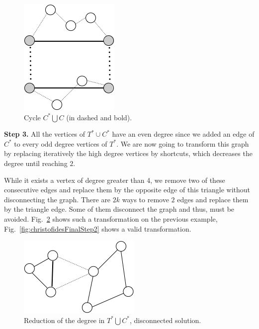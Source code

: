 \begin{figure}[hbt]
\begin{center}
       \includegraphics[scale=0.7]{FiguresGraph/perfectmatching3}
       \caption{Cycle $C^* \bigcup C$ (in dashed and bold).}
              \label{fig:perfectMatchingC}
\end{center}
\end{figure}

\bigskip

\textbf{Step 3.} 
All the vertices of $T^* \cup C^*$ have an even degree since we added an edge of $C^*$ to every odd degree vertices of $T^*$. 
We are now going to transform this graph by replacing iteratively the high degree vertices by shortcuts, 
which decreases the degree until reaching $2$. 

While it exists a vertex of degree greater than 4, we remove two of these consecutive edges and replace them 
by the opposite edge of this triangle 
without disconnecting the graph. 
There are $2k$ ways to remove $2$ edges and replace them by the triangle edge. 
Some of them disconnect the graph and thus, must be avoided. 
Fig.~\ref{fig:christofidesFinalStep1} shows such a transformation on the previous example, 
Fig.~\ref{fig:christofidesFinalStep2} shows a valid transformation.

\begin{figure}[hbt]
\begin{center}
       \includegraphics[scale=0.6]{FiguresGraph/christofides4}
       \caption{Reduction of the degree in $T^* \bigcup C^*$, disconnected solution.}
              \label{fig:christofidesFinalStep1}
\end{center}
\end{figure}

